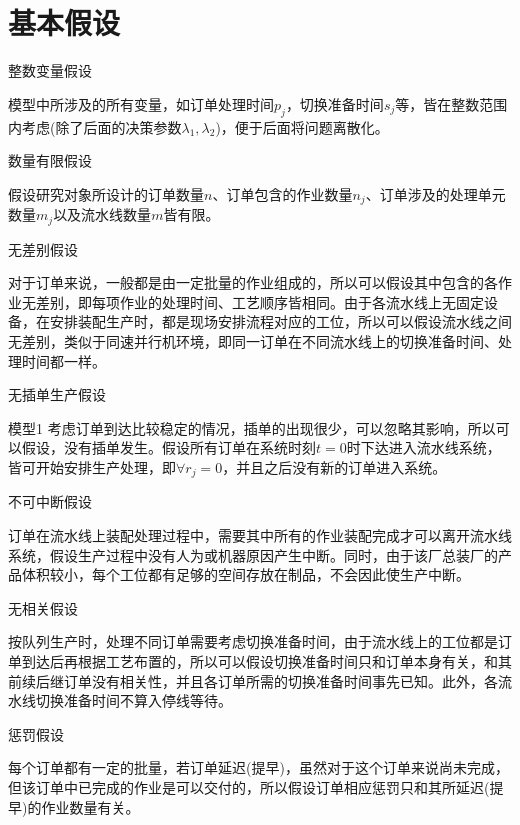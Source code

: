 \section{基本假设}
\begin{compactenum}
\item 整数变量假设

模型中所涉及的所有变量，如订单处理时间$p_j$，切换准备时间$s_j$等，皆在整数范围内考虑(除了后面的决策参数$\lambda_1, \lambda_2$)，便于后面将问题离散化。
\item 数量有限假设

假设研究对象所设计的订单数量$n$、订单包含的作业数量$n_j$、订单涉及的处理单元数量$m_j$以及流水线数量$m$皆有限。
\item 无差别假设

对于订单来说，一般都是由一定批量的作业组成的，所以可以假设其中包含的各作业无差别，即每项作业的处理时间、工艺顺序皆相同。由于各流水线上无固定设备，在安排装配生产时，都是现场安排流程对应的工位，所以可以假设流水线之间无差别，类似于同速并行机环境，即同一订单在不同流水线上的切换准备时间、处理时间都一样。
\item 无插单生产假设

模型1 考虑订单到达比较稳定的情况，插单的出现很少，可以忽略其影响，所以可以假设，没有插单发生。假设所有订单在系统时刻$t = 0$时下达进入流水线系统，皆可开始安排生产处理，即$\forall r_j =0$，并且之后没有新的订单进入系统。
\item 不可中断假设

订单在流水线上装配处理过程中，需要其中所有的作业装配完成才可以离开流水线系统，假设生产过程中没有人为或机器原因产生中断。同时，由于该厂总装厂的产品体积较小，每个工位都有足够的空间存放在制品，不会因此使生产中断。
\item 无相关假设

按队列生产时，处理不同订单需要考虑切换准备时间，由于流水线上的工位都是订单到达后再根据工艺布置的，所以可以假设切换准备时间只和订单本身有关，和其前续后继订单没有相关性，并且各订单所需的切换准备时间事先已知。此外，各流水线切换准备时间不算入停线等待。
\item 惩罚假设
\end{compactenum}

每个订单都有一定的批量，若订单延迟(提早)，虽然对于这个订单来说尚未完成，但该订单中已完成的作业是可以交付的，所以假设订单相应惩罚只和其所延迟(提早)的作业数量有关。

